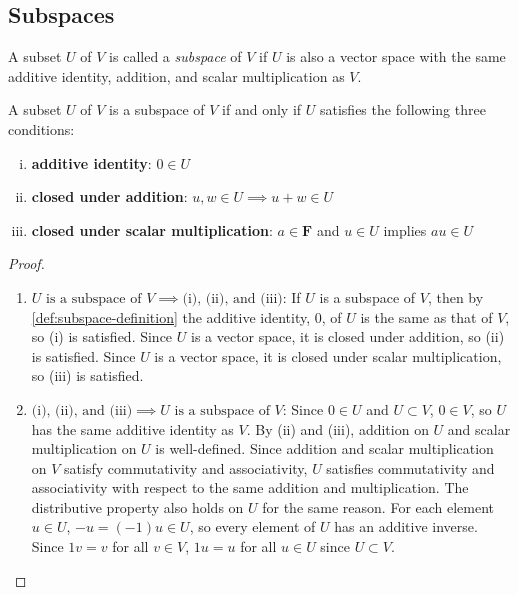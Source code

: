 \documentclass{article}
\begin{document}
\subsection{Subspaces}

\begin{definition}
  \label{def:subspace-definition}
A subset $U$ of $V$ is called a \textit{subspace} of $V$ if $U$ is
also a vector space with the same additive identity, addition, and
scalar multiplication as $V$.
\end{definition}

\begin{theorem}
  \label{thm:conditions-for-subspace}
  A subset $U$ of $V$ is a subspace of $V$ if and only if $U$
  satisfies the following three conditions:
  \begin{enumerate}[(i)]
  \item
    \textbf{additive identity}: $0 \in U$
  \item
    \textbf{closed under addition}: $u, w \in U \implies u + w \in U$
  \item
    \textbf{closed under scalar multiplication}: $a \in \mathbf{F}$
    and $u \in U$ implies $au \in U$ 
  \end{enumerate}
\end{theorem}
\begin{proof}
  \leavevmode
  \begin{enumerate}
  \item
    $U \text{ is a subspace of } V \implies \text{(i), (ii), and
      (iii)}$: If $U$ is a subspace of $V$, then by
    \cref{def:subspace-definition} the additive identity, $0$, of $U$
    is the same as that of $V$, so (i) is satisfied. Since $U$ is a
    vector space, it is closed under addition, so (ii) is
    satisfied. Since $U$ is a vector space, it is closed under scalar
    multiplication, so (iii) is satisfied.
  \item
    $\text{(i), (ii), and (iii)} \implies U \text{ is a subspace of }
    V$: Since $0 \in U$ and $U \subset V$, $0 \in V$, so $U$ has the
    same additive identity as $V$. By (ii) and (iii), addition on $U$
    and scalar multiplication on $U$ is well-defined. Since addition
    and scalar multiplication on $V$ satisfy commutativity and
    associativity, $U$ satisfies commutativity and associativity with
    respect to the same addition and multiplication. The distributive
    property also holds on $U$ for the same reason. For each element
    $u \in U$, $-u = (-1)u \in U$, so every element of $U$ has an
    additive inverse. Since $1v = v$ for all $v \in V$, $1u = u$ for
    all $u \in U$ since $U \subset V$.
      
  \end{enumerate}
\end{proof}
\end{document}
